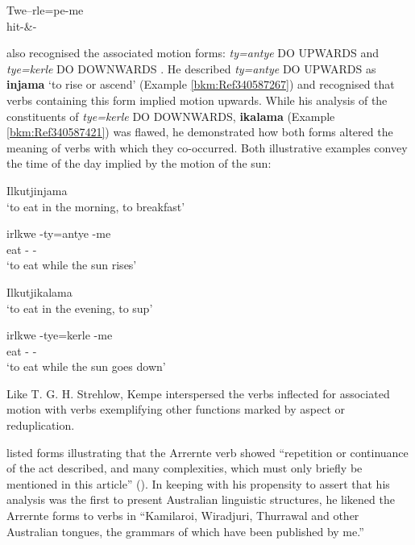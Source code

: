 \citep[19]{kempe_grammar_1891}

 \gll Twe–rle=pe-me\\
                    hit-\&-\\
\z


\citet[20]{kempe_grammar_1891} also recognised the associated motion forms: \textit{ty=antye} DO UPWARDS and \textit{tye=kerle} DO DOWNWARDS \citep[272--273]{wilkins_mparntwe_1989}. He described \textit{ty=antye} DO UPWARDS as \textbf{injama} `to rise or ascend' (Example \ref{bkm:Ref340587267}) and recognised that verbs containing this form implied motion upwards. While his analysis of the constituents of \textit{tye=kerle} DO DOWNWARDS, \textbf{ikalama} (Example \ref{bkm:Ref340587421}) was flawed, he demonstrated how both forms altered the meaning of verbs with which they co-occurred. Both illustrative examples convey the time of the day implied by the motion of the sun:

\ea
\label{bkm:Ref340587267}Ilkutjinjama\\
\glt `to eat in the morning, to breakfast'

\citep[20]{kempe_grammar_1891}

\gll irlkwe -ty=antye -me\\
eat -{ } -\\

\glt `to eat while the sun rises'
\z

\ea
\label{bkm:Ref340587421}Ilkutjikalama\\
\glt `to eat in the evening, to sup'

\citep[20]{kempe_grammar_1891}

\gll irlkwe -tye=kerle -me\\
eat -{ } -\\
\glt `to eat while the sun goes down'
\z

Like T. G. H. Strehlow, Kempe interspersed the verbs inflected for associated motion with verbs exemplifying other functions marked by aspect or reduplication.

\citet[334]{mathews_languages_1907} listed forms illustrating that the Arrernte verb showed “repetition or continuance of the act described, and many complexities, which must only briefly be mentioned in this article” (). In keeping with his propensity to assert that his analysis was the first to present Australian linguistic structures, he likened the Arrernte forms to verbs in “Kamilaroi, Wiradjuri, Thurrawal and other Australian tongues, the grammars of which have been published by me.”

